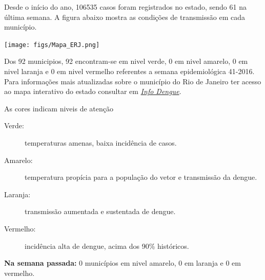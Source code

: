 \documentclass[10pt]{article} %
\begin{document}
\begin{minipage}[t]{.66\linewidth} %

\hypertarget{estado}{} %

Desde o início do ano, 106535 casos foram registrados no estado, sendo 61 na última semana. A figura abaixo mostra as condições de transmissão em cada município.

\texttt{[image: figs/Mapa\_ERJ.png]}

Dos 92 municipios, 92 encontram-se em nivel verde, 0 em nivel amarelo, 0 em nivel laranja e 0 em nivel vermelho referentes a semana epidemiológica 41-2016. Para informações mais atualizadas
sobre o município do Rio de Janeiro ter acesso ao mapa interativo do estado consultar em \href{http://info.dengue.mat.br}{\textit{Info Dengue}}.


\vspace{1cm}
\begin{mdframed}[style=intextbox,frametitle={}] %

\hypertarget{descriptivebox}{} %
As cores indicam niveis de atenção
\begin{description}
\item[Verde:] temperaturas amenas, baixa incidência de casos.      
\item[Amarelo:] temperatura propícia para a população do vetor e transmissão da dengue.
\item[Laranja:] transmissão aumentada e sustentada de dengue. 
\item[Vermelho:] incidência alta de dengue, acima dos 90\% históricos.
\end{description}
\end{mdframed}

 \textbf{Na semana passada:} 0 municípios em nivel amarelo, 0 em laranja e 0 em vermelho.    

\end{minipage} %
\end{document}
